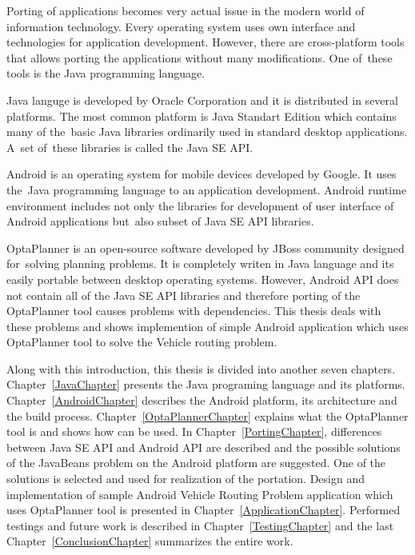 Porting of applications becomes very actual issue in the modern world of information technology. Every operating system
uses own interface and technologies for application development. However, there are cross-platform tools that allows
porting the applications without many modifications. One of~these tools is the Java programming language.

Java languge is developed by Oracle Corporation and it is distributed in several platforms. The most common platform is
Java Standart Edition which contains many of the~basic Java libraries ordinarily used in standard desktop applications.
A~set of~these libraries is called the Java SE API.

Android is an operating system for mobile devices developed by Google. It uses the~Java programming language to an
application development. Android runtime environment includes not only the libraries for development of user interface
of Android applications but~also subset of Java SE API libraries.

OptaPlanner is an open-source software developed by JBoss community designed for~solving planning problems. It is
completely writen in Java language and its easily portable between desktop operating systems. However, Android API does
not contain all of the Java SE API libraries and therefore porting of the OptaPlanner tool causes problems with
dependencies. This thesis deals with these problems and shows implemention of simple Android application which uses
OptaPlanner tool to solve the Vehicle routing problem.

Along with this introduction, this thesis is divided into another seven chapters. Chapter~\ref{JavaChapter} presents the
Java programing language and its platforms. Chapter~\ref{AndroidChapter} describes the Android platform, its
architecture and the build process. Chapter~\ref{OptaPlannerChapter} explains what the OptaPlanner tool is and shows how
can be used. In Chapter~\ref{PortingChapter}, differences between Java SE API and Android API are described and the
possible solutions of the JavaBeans problem on the Android platform are suggested. One of the solutions is selected and
used for realization of the portation. Design and implementation of sample Android Vehicle Routing Problem application
which uses OptaPlanner tool is presented in Chapter~\ref{ApplicationChapter}. Performed testings and future work is
described in Chapter~\ref{TestingChapter} and the last Chapter~\ref{ConclusionChapter} summarizes the entire work.

